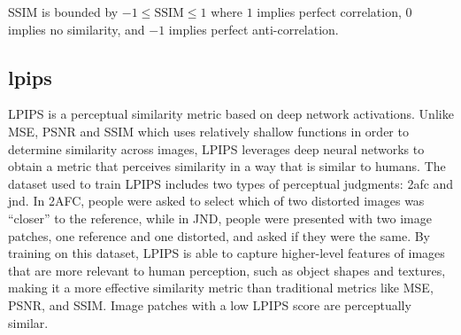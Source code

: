 

\begin{comment}
\begin{itemize}
    \item $\mu$ represents the pixel sample mean for both $x$ and $y$,
    \item $\sigma^2$ represents the variance for both $x$ and $y$,
    \item $\sigma_{xy}$ represents the covariance of x and y,
    \item $c_1 = (k_1L)^2$, $c_2 = (k_2L)^2$ are variables to stabilize the division with weak denominator,
    \item $L$ represents the dynamic range of the pixel-values,
    \item $k_1 = 0.01$, $k_2 = 0.03$ by default   
\end{itemize}
\end{comment}

SSIM is bounded by $-1 \leq \text{SSIM} \leq 1$ where $1$ implies perfect correlation, $0$ implies no similarity, and $-1$ implies perfect anti-correlation.


\subsection[LPIPS]{\acrfull{lpips}}
LPIPS \cite{zhang_unreasonable_2018} is a perceptual similarity metric based on deep network activations. Unlike MSE, PSNR and SSIM which uses relatively shallow functions in order to determine similarity across images, LPIPS leverages deep neural networks to obtain a metric that perceives similarity in a way that is similar to humans. The dataset used to train LPIPS includes two types of perceptual judgments: \acrfull{2afc} and \acrfull{jnd}. In 2AFC, people were asked to select which of two distorted images was “closer” to the reference, while in JND, people were presented with two image patches, one reference and one distorted, and asked if they were the same. By training on this dataset, LPIPS is able to capture higher-level features of images that are more relevant to human perception, such as object shapes and textures, making it a more effective similarity metric than traditional metrics like MSE, PSNR, and SSIM. Image patches with a low LPIPS score are perceptually similar.





